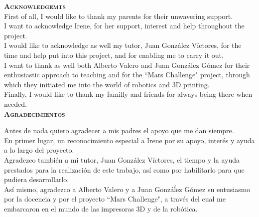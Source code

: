 
\vspace*{2cm}
\color{part} \textsc{\Large \textbf{Acknowledgemts}}\\[0.5cm]
\color{black}
First of all, I would like to thank my parents for their unwavering support.\\

I want to acknowledge Irene, for her support, interest and help throughout the project.\\

I would like to acknowledge as well my tutor, Juan González Víctores, for the time and help put into this project, and for enabling me to carry it out.\\

I want to thank as well both Alberto Valero and Juan González Gómez for their enthusiastic approach to teaching and for the ``Mars Challenge" project, through which they initiated me into the world of robotics and 3D printing.\\

Finally, I would like to thank my familly and friends for always being there when needed.\\[1cm]

\vspace*{1cm}
\color{part} \textsc{\Large \textbf{Agradecimientos}}\\[0.5cm]
\color{black}

Antes de nada quiero agradecer a mis padres el apoyo que me dan siempre. \\

En primer lugar, un reconocimiento especial a Irene por su apoyo, interés y ayuda a lo largo del proyecto.\\

Agradezco también a mi tutor, Juan González Víctores, el tiempo y la ayuda prestados para la realización de este trabajo, así como por habilitarlo para que pudiera desarrollarlo.\\

Así mismo, agradezco a Alberto Valero y a Juan Gonzáĺez Gómez su entusiasmo por la docencia y por el proyecto ``Mars Challenge", a través del cual me embarcaron en el mundo de las impresoras 3D y de la robótica.\\

